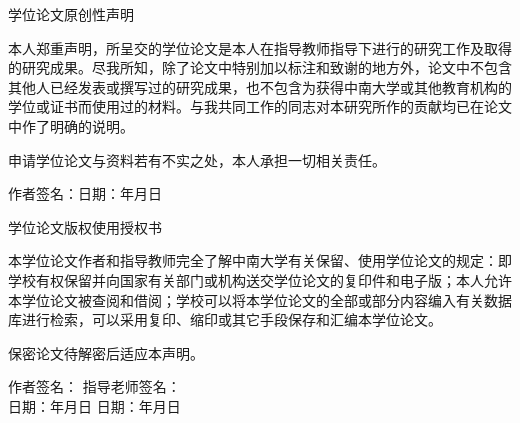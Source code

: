 \clearpage
\thispagestyle{empty}
\begin{center}
	\xinwei 学位论文原创性声明
\end{center}

本人郑重声明，所呈交的学位论文是本人在指导教师指导下进行的研究工作及取得的研究成果。尽我所知，除了论文中特别加以标注和致谢的地方外，论文中不包含其他人已经发表或撰写过的研究成果，也不包含为获得中南大学或其他教育机构的学位或证书而使用过的材料。与我共同工作的同志对本研究所作的贡献均已在论文中作了明确的说明。

申请学位论文与资料若有不实之处，本人承担一切相关责任。
\vspace{3em}

\hfill 
作者签名：\uline{\makebox[3cm][c]{}}\quad\quad\quad 日期：\uline{\makebox[1.5cm][c]{}}年\uline{\makebox[1cm][c]{}}月\uline{\makebox[1cm][c]{}}日
\vspace{5em}
\begin{center}
	\xinwei 学位论文版权使用授权书
\end{center}

本学位论文作者和指导教师完全了解中南大学有关保留、使用学位论文的规定：即学校有权保留并向国家有关部门或机构送交学位论文的复印件和电子版；本人允许本学位论文被查阅和借阅；学校可以将本学位论文的全部或部分内容编入有关数据库进行检索，可以采用复印、缩印或其它手段保存和汇编本学位论文。

保密论文待解密后适应本声明。
\vspace{2em}

\noindent
{\songti {}  作者签名：\uline{\makebox[6em][c]{}}}\hfill
{\songti {}  指导老师签名：\uline{\makebox[6em][c]{}}\quad}\\[1em]
{\songti {}  日期：\uline{\makebox[1.5cm][c]{}}年\uline{\makebox[1cm][c]{}}月\uline{\makebox[1cm][c]{}}日}\hfill
{\songti {}  日期：\uline{\makebox[1.5cm][c]{}}年\uline{\makebox[1cm][c]{}}月\uline{\makebox[1cm][c]{}}日}
\vspace{3em}
\newpage \thispagestyle{empty}~